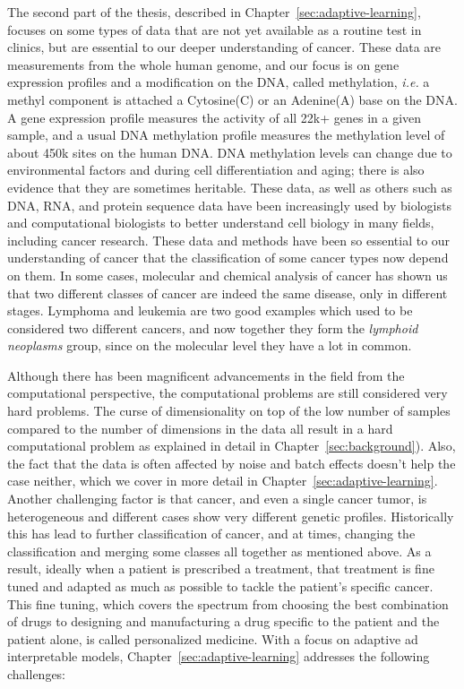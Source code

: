 The second part of the thesis, described in
Chapter~\ref{sec:adaptive-learning}, focuses on some types of data that are not
yet available as a routine test in clinics, but are essential to our deeper
understanding of cancer. These data are measurements from the whole human
genome, and our focus is on gene expression profiles and a modification on the
DNA, called methylation, \emph{i.e.} a methyl component is attached a
Cytosine(C) or an Adenine(A) base on the DNA. A gene expression profile
measures the activity of all 22k+ genes in a given sample, and a usual DNA
methylation profile measures the methylation level of about 450k sites on the
human DNA. DNA methylation levels can change due to environmental factors and
during cell differentiation and aging; there is also evidence that they are
sometimes heritable. These data, as well as others such as DNA, RNA, and
protein sequence data have been increasingly used by biologists and
computational biologists to better understand cell biology in many fields,
including cancer research. These data and methods have been so essential to our
understanding of cancer that the classification of some cancer types now depend
on them. In some cases, molecular and chemical analysis of cancer has shown us
that two different classes of cancer are indeed the same disease, only in
different stages. Lymphoma and leukemia are two good examples which used to be
considered two different cancers, and now together they form the \emph{lymphoid
  neoplasms} group, since on the molecular level they have a lot in common.

Although there has been magnificent advancements in the field from the
computational perspective, the computational problems are still considered very
hard problems. The curse of dimensionality on top of the low number of samples
compared to the number of dimensions in the data all result in a hard
computational problem as explained in detail in Chapter~\ref{sec:background}).
Also, the fact that the data is often affected by noise and batch effects
doesn't help the case neither, which we cover in more detail in
Chapter~\ref{sec:adaptive-learning}. Another challenging factor is that cancer,
and even a single cancer tumor, is heterogeneous and different cases show very
different genetic profiles. Historically this has lead to further
classification of cancer, and at times, changing the classification and merging
some classes all together as mentioned above. As a result, ideally when a
patient is prescribed a treatment, that treatment is fine tuned and adapted as
much as possible to tackle the patient's specific cancer. This fine tuning,
which covers the spectrum from choosing the best combination of drugs to
designing and manufacturing a drug specific to the patient and the patient
alone, is called personalized medicine. With a focus on adaptive ad
interpretable models, Chapter~\ref{sec:adaptive-learning} addresses the
following challenges:

